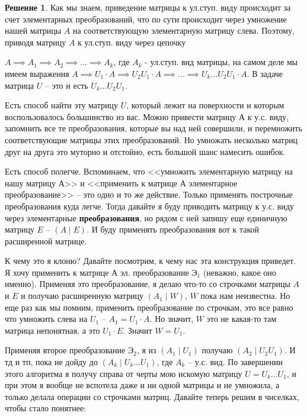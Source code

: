 \documentclass[10pt, a4paper]{extarticle}
\theoremstyle{definition}
\newtheorem*{Sol}{Решение}
\begin{document}
\begin{Sol}
Как мы знаем, приведение матрицы к ул.ступ. виду происходит за счет элементарных преобразований, что по сути происходит через умножение нашей матрицы $A$ на соответствующую элементарную матрицу слева. Поэтому, приводя матрицу $A$ к ул.ступ. виду через цепочку 

\noindent $A \implies A_1 \implies A_2 \implies \dots \implies A_k$, где $A_k$ - ул.ступ. вид матрицы, на самом деле мы имеем выражения $A \implies U_1 \cdot A \implies U_2 U_1 \cdot A \implies \dots \implies U_k \dots U_2 U_1 \cdot A$. В задаче матрица $U$ -- это и есть $ U_k \dots U_2 U_1$. 

Есть способ найти эту матрицу $U$, который лежит на поверхности и которым воспользовалось большинство из вас. Можно привести матрицу А к у.с. виду, запомнить все те преобразования, которые вы над ней совершили, и перемножить соответствующие матрицы этих преобразований. Но умножать несколько матриц друг на друга это муторно и отстойно, есть большой шанс намесить ошибок.

Есть способ полегче. Вспоминаем, что <<умножить элементарную матрицу на нашу матрицу А>> и <<применить к матрице А элементарное преобразование>> -- это одно и то же действие. Только применять построчные преобразования куда легче. Тогда давайте я буду приводить матрицу к у.с. виду через элементарные \textbf{преобразования}, но рядом с ней запишу еще единичную матрицу $E$ -- $(A \mid E)$. И буду применять преобразования вот к такой расширенной матрице. 

К чему это я клоню? Давайте посмотрим, к чему нас эта конструкция приведет. Я хочу применить к матрице А эл. преобразование $\text{Э}_1$ (неважно, какое оно именно). Применяя это преобразование, я делаю что-то со строчками матрицы $A$ и $E$ и получаю расширенную матрицу $(A_1 \mid W)$, $W$ пока нам неизвестна. Но еще раз как мы помним, применить преобразование по строчкам, это все равно что умножить слева на $U_1$ -- $A_1 = U_1 \cdot A$. Но значит, $W$ это не какая-то там матрица непонятная, а это $U_1 \cdot E$. Значит $W=U_1$.

Применяя второе преобразование  $\text{Э}_2$,  я из  $(A_1 \mid U_1)$ получаю  $(A_2 \mid U_2U_1)$. И тд и тп, пока не дойду до  $(A_k \mid U_k \dots U_1)$, где $A_k$ -- у.с. вид. По завершении этого алгоритма я получу справа от черты мою искомую матрицу $U= U_k \dots U_1$, и при этом я вообще не вспотела даже и ни одной матрицы и не умножила, а только делала операции со строчками матриц. Давайте теперь решим в чиселках, чтобы стало понятнее:


\end{Sol}
\end{document}

